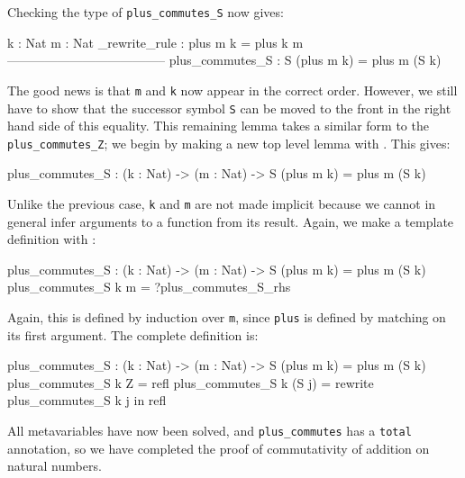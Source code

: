 Checking the type of \texttt{plus\_commutes\_S} now gives:

\begin{code}
  k : Nat
  m : Nat
  _rewrite_rule : plus m k = plus k m
--------------------------------------
plus_commutes_S : S (plus m k) = plus m (S k)
\end{code}

\noindent
The good news is that \texttt{m} and \texttt{k} now appear in the correct order.
However, we still have to show that the successor symbol \texttt{S} can be moved
to the front in the right hand side of this equality. This remaining lemma
takes a similar form to the \texttt{plus\_commutes\_Z}; we begin by making
a new top level lemma with \mklem{}. This gives:

\begin{code}
plus_commutes_S : (k : Nat) -> (m : Nat) -> S (plus m k) = plus m (S k)
\end{code}

\noindent
Unlike the previous case, \texttt{k} and \texttt{m} are not made implicit
because we cannot in general infer arguments to a function from its result.
Again, we make a template definition with \mkdef{}:

\begin{code}
plus_commutes_S : (k : Nat) -> (m : Nat) -> S (plus m k) = plus m (S k)
plus_commutes_S k m = ?plus_commutes_S_rhs
\end{code}

\noindent
Again, this is defined by induction over \texttt{m}, since \texttt{plus}
is defined by matching on its first argument. The complete definition is:

\begin{code}
plus_commutes_S : (k : Nat) -> (m : Nat) -> S (plus m k) = plus m (S k)
plus_commutes_S k Z = refl
plus_commutes_S k (S j) = rewrite plus_commutes_S k j in refl
\end{code}

\noindent
All metavariables have now been solved, and \texttt{plus\_commutes} has
a \texttt{total} annotation, so we have completed the proof of commutativity
of addition on natural numbers.










